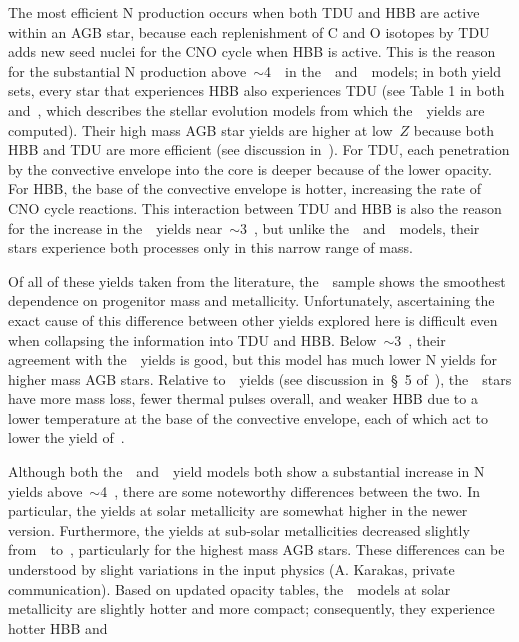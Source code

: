 \documentclass[ms.tex]{subfiles}
\begin{document}
The most efficient N production occurs when both TDU and HBB are active within
an AGB star, because each replenishment of C and O isotopes by TDU adds new
seed nuclei for the CNO cycle when HBB is active.
This is the reason for the substantial N production above~$\sim$4~\msun~in
the~\karakasten~and~\karakas~models; in both yield sets, every star that
experiences HBB also experiences TDU (see Table 1 in both~\citealt{Karakas2010}
and~\citealt{Karakas2014}, which describes the stellar evolution models from
which the~\karakas~yields are computed).
Their high mass AGB star yields are higher at low~$Z$ because both HBB and TDU
are more efficient (see discussion in~\citealp{Ventura2013}).
For TDU, each penetration by the convective envelope into the core is deeper
because of the lower opacity.
For HBB, the base of the convective envelope is hotter, increasing the rate
of CNO cycle reactions.
This interaction between TDU and HBB is also the reason for the increase in
the~\ventura~yields near~$\sim$3~\msun, but unlike
the~\karakasten~and~\karakas~models, their stars experience both processes only
in this narrow range of mass.
\par
Of all of these yields taken from the literature, the~\cristallo~sample shows
the smoothest dependence on progenitor mass and metallicity.
Unfortunately, ascertaining the exact cause of this difference between other
yields explored here is difficult even when collapsing the information into
TDU and HBB.
Below~$\sim$3~\msun, their agreement with the~\karakas~yields is good, but this
model has much lower N yields for higher mass AGB stars.
Relative to~\karakas~yields (see discussion in~\S~5 of~\citealp{Karakas2016}),
the~\cristallo~stars have more mass loss, fewer thermal pulses overall, and
weaker HBB due to a lower temperature at the base of the convective envelope,
each of which act to lower the yield of~\Nfourteen.
\par
Although both the~\karakasten~and~\karakas~yield models both show a substantial
increase in N yields above~$\sim$4~\msun, there are some noteworthy differences
between the two.
In particular, the yields at solar metallicity are somewhat higher in the
newer version.
Furthermore, the yields at sub-solar metallicities decreased slightly
from~\karakasten~to~\karakas, particularly for the highest mass AGB stars.
These differences can be understood by slight variations in the input physics
(A. Karakas, private communication).
Based on updated opacity tables, the~\karakas~models at solar metallicity are
slightly hotter and more compact; consequently, they experience hotter HBB and
\end{document}

